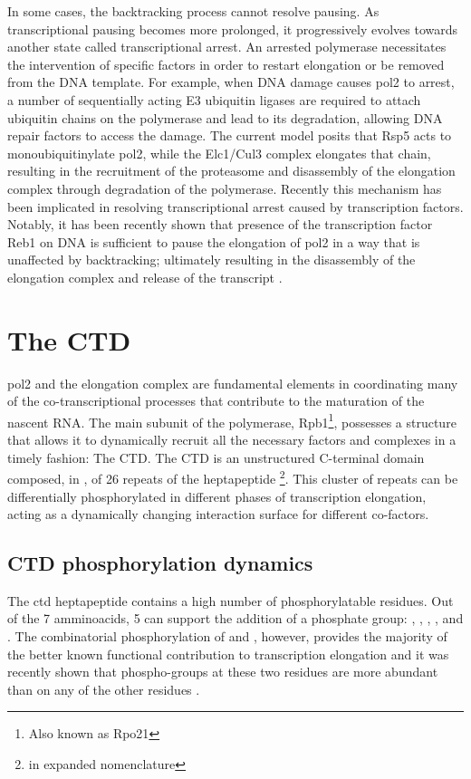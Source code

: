 In some cases, the backtracking process cannot resolve pausing.
As transcriptional pausing becomes more prolonged, it progressively evolves towards another state called transcriptional arrest.
An arrested polymerase necessitates the intervention of specific factors in order to restart elongation or be removed from the DNA template.
For example, when DNA damage causes \gls{pol2} to arrest, a number of sequentially acting E3 ubiquitin ligases are required to attach ubiquitin chains on the polymerase and lead to its degradation, allowing DNA repair factors to access the damage. 
The current model posits that Rsp5 acts to monoubiquitinylate \gls{pol2}, while the Elc1/Cul3 complex elongates that chain, resulting in the recruitment of the proteasome and disassembly of the elongation complex through degradation of the polymerase.
Recently this mechanism has been implicated in resolving transcriptional arrest caused by transcription factors.
Notably, it has been recently shown that presence of the transcription factor Reb1 on DNA is sufficient to pause the elongation of \gls{pol2} in a way that is unaffected by backtracking; ultimately resulting in the disassembly of the elongation complex and release of the transcript \cite{colin:2014:roadblock}.
 


\section{The CTD}
\gls{pol2} and the elongation complex are fundamental elements in coordinating many of the co-transcriptional processes that contribute to the maturation of the nascent RNA.
The main subunit of the polymerase, Rpb1\footnote{Also known as Rpo21}, possesses a structure that allows it to dynamically recruit all the necessary factors and complexes in a timely fashion: The CTD. 
The CTD is an unstructured C-terminal domain composed, in \cer, of 26 repeats of the heptapeptide \ctdshort{} \footnote{\ctdlong{} in expanded nomenclature}.
This cluster of repeats can be differentially phosphorylated in different phases of transcription elongation, acting as a dynamically changing interaction surface for different co-factors. 

\subsection{CTD phosphorylation dynamics} 
The \gls{ctd} heptapeptide contains a high number of phosphorylatable residues.
Out of the 7 amminoacids, 5 can support the addition of a phosphate group: \tyr{}, \sert{}, \thr{}, \serf{}, and \sers{}.
The combinatorial phosphorylation of \sert{} and \serf{}, however, provides the majority of the better known functional contribution to transcription elongation and it was recently shown that phospho-groups at these two residues are more abundant than on any of the other residues \citep{suh:2016:direct}.

